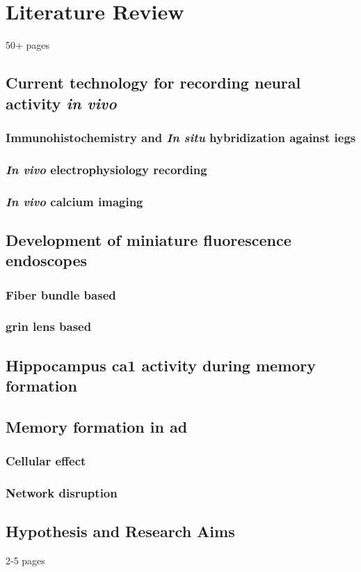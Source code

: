 \chapter{Literature Review}
50+ pages

\section{Current technology for recording neural activity \textit{in vivo}}
\subsection{Immunohistochemistry and \textit{In situ} hybridization against \glspl{ieg}}
\subsection{\textit{In vivo} electrophysiology recording}
\subsection{\textit{In vivo} calcium imaging}

\section{Development of miniature fluorescence endoscopes}
\subsection{Fiber bundle based}
\subsection{\gls{grin} lens based}

\section{Hippocampus \gls{ca1} activity during memory formation}

\section{Memory formation in \gls{ad}}
\subsection{Cellular effect}
\subsection{Network disruption}

\section{Hypothesis and Research Aims}
2-5 pages
